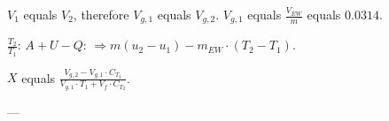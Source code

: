 \( V_1 \) equals \( V_2 \), therefore \( V_{g,1} \) equals \( V_{g,2} \).  
\( V_{g,1} \) equals \( \frac{V_{EW}}{m} \) equals \( 0.0314 \).  

\( \frac{T_2}{T_1} \):  
\( A + U - Q \):  
\( \Rightarrow m (u_2 - u_1) - m_{EW} \cdot (T_2 - T_1) \).  

\( X \) equals \( \frac{V_{g,2} - V_{g,1} \cdot C_{T_2}}{V_{g,1} \cdot T_{1} + V_{f} \cdot C_{T_2}} \).  

---